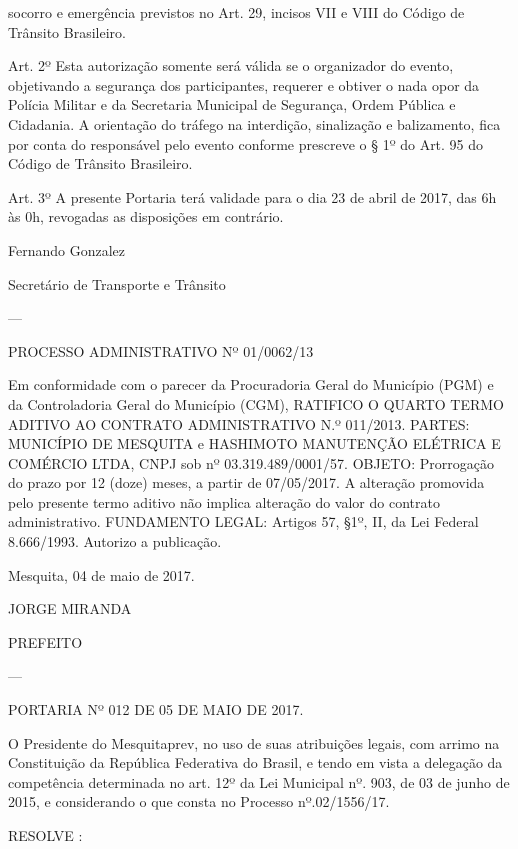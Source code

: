 \documentclass{doliberto}
\begin{document}
socorro e emergência previstos no Art. 29, incisos VII e VIII 
do Código de Trânsito Brasileiro.  
 
Art. 2º Esta autorização somente será válida se o 
organizador do evento, objetivando a segurança dos 
participantes, requerer e obtiver o nada opor da Polícia 
Militar e da Secretaria Municipal de Segurança, Ordem 
Pública e Cidadania.  A orientação do tráfego na 
interdição, sinalização e balizamento, fica por conta do 
responsável pelo evento conforme prescreve o § 1º do 
Art. 95 do Código de Trânsito Brasileiro.  
 
Art. 3º A presente Portaria terá validade para o dia 23 de 
abril de 2017, das 6h às 0h, revogadas as disposições em 
contrário. 

Fernando Gonzalez 

Secretário de Transporte e Trânsito 

---

PROCESSO ADMINISTRATIVO Nº 01/0062/13 

Em  conformidade  com  o  parecer  da  Procuradoria  Geral  do 
Município (PGM) e da Controladoria Geral do Município (CGM), 
RATIFICO  O  QUARTO  TERMO  ADITIVO  AO  CONTRATO 
ADMINISTRATIVO  N.º  011/2013.  PARTES:  MUNICÍPIO  DE 
MESQUITA  e  HASHIMOTO  MANUTENÇÃO  ELÉTRICA  E 
COMÉRCIO  LTDA,  CNPJ  sob  nº  03.319.489/0001/57.  OBJETO: 
Prorrogação  do  prazo  por  12  (doze)  meses,  a  partir  de 
07/05/2017.  A  alteração  promovida  pelo  presente  termo 
aditivo  não 
implica  alteração  do  valor  do  contrato 
administrativo. FUNDAMENTO LEGAL: Artigos 57, §1º, II, da Lei 
Federal 8.666/1993. Autorizo a publicação. 
 

Mesquita, 04 de maio de 2017. 

JORGE MIRANDA 

PREFEITO 

---

PORTARIA Nº 012 DE 05 DE MAIO DE 2017.  

O  Presidente  do  Mesquitaprev,  no  uso  de  suas  atribuições 
legais, com arrimo na Constituição da República Federativa 
do  Brasil,  e  tendo  em  vista  a  delegação  da  competência 
determinada no art. 12º da Lei Municipal nº. 903, de 03 de 
junho  de  2015,  e  considerando  o  que  consta  no  Processo 
nº.02/1556/17. 

                                                                                                                                      
RESOLVE : 
\end{document}
